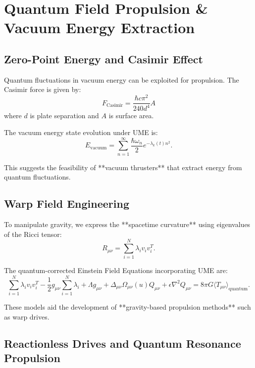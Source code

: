 \documentclass[12]{amsart}
\theoremstyle{plain}
\begin{document}
\section{Quantum Field Propulsion \& Vacuum Energy Extraction}

\subsection{Zero-Point Energy and Casimir Effect}

Quantum fluctuations in vacuum energy can be exploited for propulsion. The Casimir force is given by:
\begin{equation}
F_{\text{Casimir}} = \frac{\hbar c \pi^2}{240 d^4} A
\end{equation}
where $d$ is plate separation and $A$ is surface area.

The vacuum energy state evolution under UME is:
\begin{equation}
E_{\text{vacuum}} = \sum_{n=1}^{\infty} \frac{\hbar \omega_n}{2} e^{-\lambda_k (t) n^2}.
\end{equation}

This suggests the feasibility of **vacuum thrusters** that extract energy from quantum fluctuations.

\subsection{Warp Field Engineering}

To manipulate gravity, we express the **spacetime curvature** using eigenvalues of the Ricci tensor:
\begin{equation}
R_{\mu\nu} = \sum_{i=1}^{N} \lambda_i v_i v_i^T.
\end{equation}

The quantum-corrected Einstein Field Equations incorporating UME are:
\begin{equation}
\sum_{i=1}^{N} \lambda_i v_i v_i^T - \frac{1}{2} g_{\mu\nu} \sum_{i=1}^{N} \lambda_i + \Lambda g_{\mu\nu} + \Delta_{\mu\nu} \Omega_{\mu\nu} (u) Q_{\mu\nu} + \epsilon \nabla^2 Q_{\mu\nu} = 8 \pi G \langle T_{\mu\nu} \rangle_{\text{quantum}}.
\end{equation}

These models aid the development of **gravity-based propulsion methods** such as warp drives.

\subsection{Reactionless Drives and Quantum Resonance Propulsion}
\end{document}
